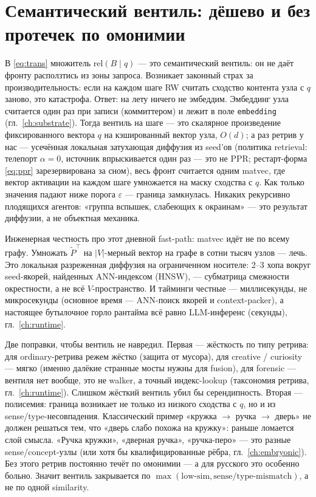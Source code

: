 \section{Семантический вентиль: дёшево и без протечек по омонимии}
\label{sec:semgate}

В \eqref{eq:trans} множитель $\mathrm{rel}(B \mid q)$ --- это семантический
вентиль: он не даёт фронту расползтись из зоны запроса. Возникает законный
страх за производительность: если на каждом шаге RW считать сходство контента
узла с $q$ заново, это катастрофа. Ответ: на лету ничего не эмбеддим.
Эмбеддинг узла считается один раз при записи (коммиттером) и лежит в поле
\texttt{embedding} (гл.~\ref{ch:substrate}). Тогда вентиль на шаге --- это
скалярное произведение фиксированного вектора $q$ на кэшированный вектор узла,
$O(d)$; а раз ретрив у нас --- усечённая локальная затухающая диффузия из
seed'ов (политика retrieval: телепорт $\alpha = 0$, источник впрыскивается один
раз --- это не PPR; рестарт-форма \eqref{eq:ppr} зарезервирована за сном), весь
фронт считается одним matvec, где вектор активации на каждом шаге умножается на
маску сходства с $q$. Как только значения падают ниже порога $\varepsilon$ ---
граница замкнулась. Никаких рекурсивно плодящихся агентов: «группа вспышек,
слабеющих к окраинам» --- это результат диффузии, а не объектная механика.

Инженерная честность про этот дневной fast-path: matvec идёт не по всему
графу. Умножать $\tilde{P}^{\top}$ на $|V|$-мерный вектор на графе в сотни
тысяч узлов --- лечь. Это локальная разреженная диффузия на ограниченном
носителе: 2--3 хопа вокруг seed-якорей, найденных ANN-индексом (HNSW), ---
субматрица смежности окрестности, а не всё $V$-пространство. И тайминги честные
--- миллисекунды, не микросекунды (основное время --- ANN-поиск якорей и
context-packer), а настоящее бутылочное горло рантайма всё равно LLM-инференс
(секунды), гл.~\ref{ch:runtime}.

Две поправки, чтобы вентиль не навредил. Первая --- жёсткость по типу
ретрива: для ordinary-ретрива режем жёстко (защита от мусора), для
creative / curiosity --- мягко (именно далёкие странные мосты нужны для fusion),
для forensic --- вентиля нет вообще, это не walker, а точный индекс-lookup
(таксономия ретрива, гл.~\ref{ch:runtime}). Слишком жёсткий вентиль убил бы
серендипность. Вторая --- полисемия: граница возникает не только из низкого
сходства с $q$, но и из sense/type-несовпадения. Классический пример
«кружка $\to$ ручка $\to$ дверь» не должен решаться тем, что «дверь слабо
похожа на кружку»: раньше ломается слой смысла. «Ручка кружки», «дверная
ручка», «ручка-перо» --- это разные sense/concept-узлы (или хотя бы
квалифицированные рёбра, гл.~\ref{ch:embryonic}). Без этого ретрив постоянно
течёт по омонимии --- а для русского это особенно больно. Значит вентиль
закрывается по $\max(\text{low-sim}, \text{sense/type-mismatch})$, а не по одной
similarity.

